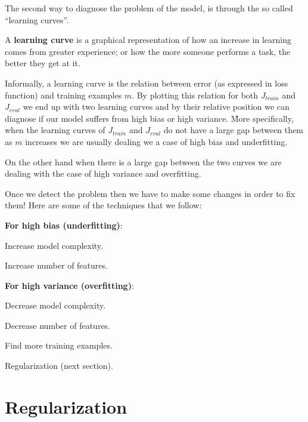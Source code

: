 The second way to diagnose the problem of the model, is through the so called ``learning curves''.

A \textbf{learning curve} is a graphical representation of how an increase in learning comes from greater experience;
or how the more someone performs a task, the better they get at it.
\ed

Informally, a learning curve is the relation between error (as expressed in loss function) and training examples $m$.
By plotting this relation for both $J_{train}$ and $J_{eval}$ we end up with two learning curves and by their
relative position we can diagnose if our model suffers from high bias or high variance. \v

More specifically, when the learning curves of $J_{train}$ and $J_{eval}$ do not have a large gap between them as $m$
increases we are usually dealing we a case of high bias and underfitting.

\vspace{10pt}


\vspace{10pt}

On the other hand when there is a large gap between the two curves we are dealing with the case of high variance and
overfitting.

\vspace{10pt}


\vspace{10pt}

Once we detect the problem then we have to make some changes in order to fix them! Here are some of the techniques
that we follow:
\bit
\item \textbf{For high bias (underfitting)}:
\bit
\item Increase model complexity.
\item Increase number of features.
\eit
\item \textbf{For high variance (overfitting)}:
\bit
\item Decrease model complexity.
\item Decrease number of features.
\item Find more training examples.
\item Regularization (next section).
\eit
\eit

\section{Regularization}

